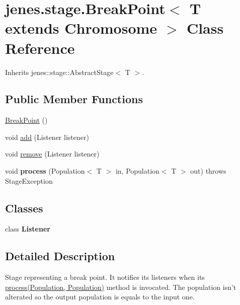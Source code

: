 \hypertarget{classjenes_1_1stage_1_1_break_point_3_01_t_01extends_01_chromosome_01_4}{
\section{jenes.stage.BreakPoint$<$ T extends Chromosome $>$ Class Reference}
\label{classjenes_1_1stage_1_1_break_point_3_01_t_01extends_01_chromosome_01_4}
}
Inherits jenes::stage::AbstractStage$<$ T $>$.

\subsection*{Public Member Functions}
\begin{CompactItemize}
\item 
\hyperlink{classjenes_1_1stage_1_1_break_point_3_01_t_01extends_01_chromosome_01_4_242b4e33e148a17a0f2d19e1963aa990}{BreakPoint} ()
\item 
void \hyperlink{classjenes_1_1stage_1_1_break_point_3_01_t_01extends_01_chromosome_01_4_ac70bbcb2e82710fe969bf1545c3a9f4}{add} (Listener listener)
\item 
void \hyperlink{classjenes_1_1stage_1_1_break_point_3_01_t_01extends_01_chromosome_01_4_367d07e34b42c06b692ec35d0a8f8a40}{remove} (Listener listener)
\item 
\hypertarget{classjenes_1_1stage_1_1_break_point_3_01_t_01extends_01_chromosome_01_4_2fa0c075727e667e633bb9d3eb2b9e71}{
void \textbf{process} (Population$<$ T $>$ in, Population$<$ T $>$ out)  throws StageException }
\label{classjenes_1_1stage_1_1_break_point_3_01_t_01extends_01_chromosome_01_4_2fa0c075727e667e633bb9d3eb2b9e71}

\end{CompactItemize}
\subsection*{Classes}
\begin{CompactItemize}
\item 
class \textbf{Listener}
\end{CompactItemize}


\subsection{Detailed Description}
Stage representing a break point. It notifies its listeners when its \hyperlink{}{process(Population, Population)} method is invocated. The population isn't alterated so the output population is equals to the input one.

